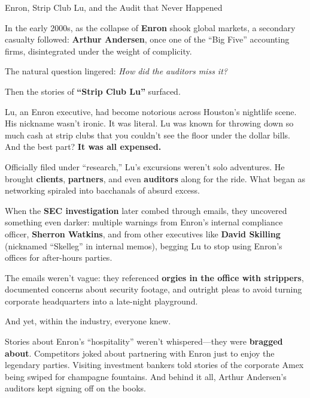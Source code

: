 \begin{HistoricalSidebar}{Enron, Strip Club Lu, and the Audit that Never Happened}

  In the early 2000s, as the collapse of \textbf{Enron} shook global markets, a secondary casualty followed: \textbf{Arthur Andersen}, once one of the “Big Five” accounting firms, disintegrated under the weight of complicity.  

  \medskip
  
  The natural question lingered: \textit{How did the auditors miss it?}  

  \medskip
  
  Then the stories of \textbf{“Strip Club Lu”} surfaced.  
  
  \medskip
  
  Lu, an Enron executive, had become notorious across Houston’s nightlife scene. His nickname wasn’t ironic. It was literal. Lu was known for throwing down so much cash at strip clubs that you couldn’t see the floor under the dollar bills. And the best part?  \textbf{It was all expensed.}  

  \medskip
  
  Officially filed under “research,” Lu’s excursions weren’t solo adventures. He brought \textbf{clients}, \textbf{partners}, and even \textbf{auditors} along for the ride. What began as networking spiraled into bacchanals of absurd excess.  
  
  \medskip
  
  When the \textbf{SEC investigation} later combed through emails, they uncovered something even darker: multiple warnings from Enron’s internal compliance officer, \textbf{Sherron Watkins}, and from other executives like \textbf{David Skilling} (nicknamed “Skelleg” in internal memos), begging Lu to stop using Enron’s offices for after-hours parties.  

  \medskip
  
  The emails weren’t vague: they referenced \textbf{orgies in the office with strippers}, documented concerns about security footage, and outright pleas to avoid turning corporate headquarters into a late-night playground.  
  
  \medskip
  
  And yet, within the industry, everyone knew.  

  \medskip
  
  Stories about Enron’s “hospitality” weren’t whispered—they were \textbf{bragged about}. Competitors joked about partnering with Enron just to enjoy the legendary parties. Visiting investment bankers told stories of the corporate Amex being swiped for champagne fountains. And behind it all, Arthur Andersen’s auditors kept signing off on the books.  
  

\end{HistoricalSidebar}

